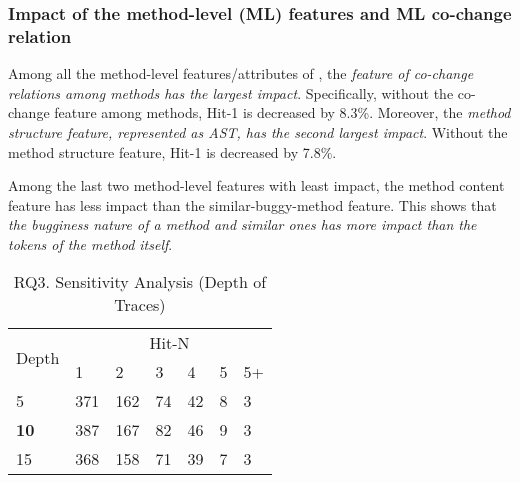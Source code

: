 
\subsubsection{{\bf Impact of the method-level (ML) features and ML co-change relation}}

Among all the method-level features/attributes of {\tool}, the {\em
feature of co-change relations among methods has the largest impact}.
Specifically, without the co-change feature among methods, Hit-1 is
decreased by 8.3\%. Moreover, the {\it method structure feature,
represented as AST, has the second largest impact}. Without the
method structure feature, Hit-1 is decreased by 7.8\%.

Among the last two method-level features with least impact, the method
content feature has less impact than the similar-buggy-method
feature. This shows that {\em the bugginess nature of a method and
similar ones has more impact than the tokens of the method itself}.





\begin{table}[t]
	\caption{RQ3. Sensitivity Analysis (Depth of Traces)}
        \vspace{-9pt}
	{\small
		\begin{center}
			\renewcommand{\arraystretch}{1}
			\begin{tabular}{p{1cm}|p{0.3cm}<{\centering}|p{0.3cm}<{\centering}|p{0.3cm}<{\centering}|p{0.3cm}<{\centering}|p{0.3cm}<{\centering}|p{0.3cm}<{\centering}}
				\hline
				\multirow{2}{*}{Depth}    & \multicolumn{6}{c}{Hit-N}\\
				\cline{2-7}
				&1&2&3&4&5&5+\\
				
				\hline 
				5 			                & 371 & 162 & 74  & 42 & 8 & 3 \\
			{\bf	10}                         & 387 & 167 & 82  & 46 & 9 & 3   \\
				15	                        & 368 & 158 & 71  & 39 & 7 & 3 \\
				\hline
			\end{tabular}
			
			\label{fig:rq3-2}
		\end{center}
	}
\end{table}

